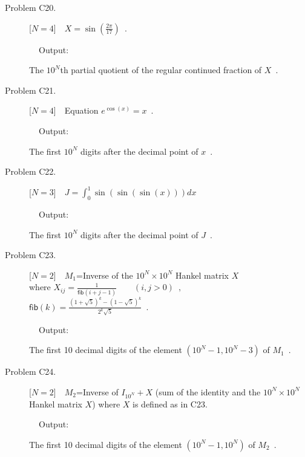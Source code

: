 \documentclass{article}
\newcommand{\fib}{\ensuremath{\textsf{fib}}}
\begin{document}
\begin{description}
\item[Problem C20.] [$N=4$]~~$X = \sin(\frac{2\ensuremath{\pi}}{17})\enspace.$
\item[~~~~~~~~Output:]The \ensuremath{10^N}th partial quotient of the regular continued fraction of $X\enspace$.

\item[Problem C21.] [$N=4$]~~Equation $e^{\cos(x)} = x\enspace.$
\item[~~~~~~~~Output:]The first \ensuremath{10^N} digits after the decimal point of $x\enspace$.

\item[Problem C22.] [$N=3$]~~$J=\int_{0}^{1}\sin(\sin(\sin(x)))dx$
\item[~~~~~~~~Output:]The first \ensuremath{10^N} digits after the decimal point of $J\enspace$.

\item[Problem C23.] [$N=2$]~~$M_1$=Inverse of the
  $\ensuremath{10^N}\times\ensuremath{10^N}$ Hankel matrix $X$\\
  where
  $X_{ij}=\frac{1}{\fib(i+j-1)}\qquad(i,j>0)\enspace,\quad$
  $\fib(k)=\frac{(1+\sqrt{5})^k-(1-\sqrt{5})^k}{2^k\sqrt{5}}\enspace.$
\item[~~~~~~~~Output:]The first 10 decimal digits of the element $(10^{N}{-}1,10^{N}{-}3)$ of $M_1\enspace$.


\item[Problem C24.] [$N=2$]~~$M_2$=Inverse of
  $I_{\ensuremath{10^N}}+X$ (sum of the identity and the
  $\ensuremath{10^N}\times\ensuremath{10^N}$ Hankel matrix $X$)
  where $X$ is defined as in C23.

\item[~~~~~~~~Output:]The first 10 decimal digits of the element $(10^{N}{-}1,\ensuremath{10^N})$ of $M_2\enspace$.


\end{description}
\end{document}
